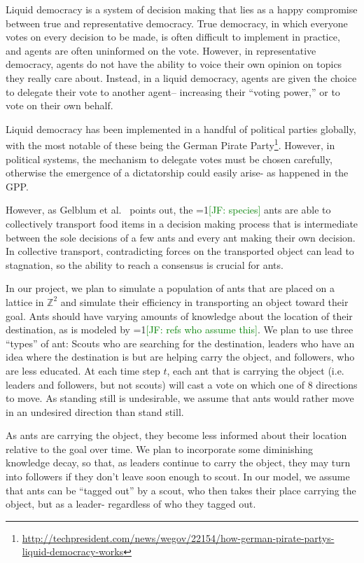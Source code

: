 \documentclass[12pt]{article}
\newcommand{\Comments}{1}
\newcommand{\mynote}[2]{\ifnum\Comments=1\textcolor{#1}{#2}\fi}
\newcommand{\jessie}[1]{\mynote{green}{[JF: #1]}}
\begin{document}
Liquid democracy is a system of decision making that lies as a happy compromise between true and representative democracy.
True democracy, in which everyone votes on every decision to be made, is often difficult to implement in practice, and agents are often uninformed on the vote.
However, in representative democracy, agents do not have the ability to voice their own opinion on topics they really care about.
Instead, in a liquid democracy, agents are given the choice to delegate their vote to another agent-- increasing their ``voting power,'' or to vote on their own behalf.


Liquid democracy has been implemented in a handful of political parties globally, with the most notable of these being the German Pirate Party\footnote{\url{http://techpresident.com/news/wegov/22154/how-german-pirate-partys-liquid-democracy-works}}.
However, in political systems, the mechanism to delegate votes must be chosen carefully, otherwise the emergence of a dictatorship could easily arise- as happened in the GPP.

However, as Gelblum et al.~\cite{gelblum2015ant} points out, the \jessie{species} ants are able to collectively transport food items in a decision making process that is intermediate between the sole decisions of a few ants and every ant making their own decision.
In collective transport, contradicting forces on the transported object can lead to stagnation, so the ability to reach a consensus is crucial for ants.

In our project, we plan to simulate a population of ants that are placed on a lattice in $\mathbb{Z}^2$ and simulate their efficiency in transporting an object toward their goal.
Ants should have varying amounts of knowledge about the location of their destination, as is modeled by \jessie{refs who assume this}.
We plan to use three ``types'' of ant: Scouts who are searching for the destination, leaders who have an idea where the destination is but are helping carry the object, and followers, who are less educated.
At each time step $t$, each ant that is carrying the object (i.e. leaders and followers, but not scouts) will cast a vote on which one of 8 directions to move.
As standing still is undesirable, we assume that ants would rather move in an undesired direction than stand still.

As ants are carrying the object, they become less informed about their location relative to the goal over time.
We plan to incorporate some diminishing knowledge decay, so that, as leaders continue to carry the object, they may turn into followers if they don't leave soon enough to scout.
In our model, we assume that ants can be ``tagged out'' by a scout, who then takes their place carrying the object, but as a leader- regardless of who they tagged out.
\end{document}
